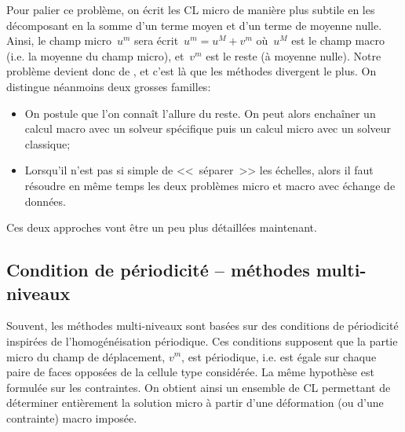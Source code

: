 
Pour palier ce problème, on écrit les CL micro de manière plus subtile en les décomposant
en la somme d'un terme moyen et d'un terme de moyenne nulle. Ainsi, le champ micro~$u^m$
sera écrit~$u^m=u^M +v^m$ où~$u^M$ est le champ macro (i.e. la moyenne du champ micro),
et~$v^m$ est le reste (à moyenne nulle).
Notre problème devient donc de , et c'est là
que les méthodes divergent le plus. On distingue néanmoins deux grosses familles:
\begin{itemize}
  \item {}

	On postule que l'on connaît l'allure du reste. On peut alors enchaîner un calcul macro
	avec un solveur spécifique puis un calcul micro avec un solveur classique;
  \item {}

	Lorsqu'il n'est pas si simple de <<~séparer~>> les échelles, alors il faut résoudre
	en même temps les deux problèmes micro et macro avec échange de données.
\end{itemize}
Ces deux approches vont être un peu plus détaillées maintenant.




\medskip
\subsection{Condition de périodicité -- méthodes multi-niveaux}

Souvent, les méthodes multi-niveaux sont basées sur des conditions de périodicité
inspirées de l'homogénéisation périodique.
Ces conditions supposent que la partie micro du champ de déplacement, $v^m$, est périodique,
i.e. est égale sur chaque paire de faces opposées de la cellule type considérée.
La même hypothèse est formulée sur les contraintes.
On obtient ainsi un ensemble de CL permettant de déterminer entièrement la solution micro à
partir d'une déformation (ou d'une contrainte) macro imposée.

